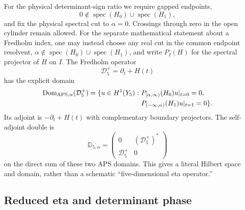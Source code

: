 \documentclass[11pt]{article}
\theoremstyle{definition}
\theoremstyle{remark}
\newcommand{\cD}{\mathcal D}
\begin{document}
For the physical determinant-sign ratio we require gapped endpoints,
\begin{equation}
 0\notin\operatorname{spec}(H_0)\cup\operatorname{spec}(H_1),
 \label{eq:zero-cut-gap}
\end{equation}
and fix the physical spectral cut to \(\alpha=0\).  Crossings through zero in
the open cylinder remain allowed.  For the separate mathematical statement
about a Fredholm index, one may instead choose any real cut in the common
endpoint resolvent,
\(\alpha\notin\operatorname{spec}(H_0)\cup\operatorname{spec}(H_1)\), and
write \(P_I(H)\) for the spectral projector of \(H\) on \(I\).  The Fredholm
operator
\begin{equation}
 \cD_5^+=\partial_t+H(t)
 \label{eq:five-d-operator}
\end{equation}
has the explicit domain
\begin{equation}
 \begin{split}
 \operatorname{Dom}_{\rm APS,\alpha}(\cD_5^+)
 =\{u\in H^1(Y_5):\ &P_{[\alpha,\infty)}(H_0)u|_{t=0}=0,\\
 &P_{(-\infty,\alpha)}(H_1)u|_{t=1}=0\}.
 \end{split}
 \label{eq:aps-domain}
\end{equation}
Its adjoint is \(-\partial_t+H(t)\) with complementary boundary projectors.
The self-adjoint double is
\begin{equation}
 \mathbb D_{5,\alpha}=
 \begin{pmatrix}0&(\cD_5^+)^*\\ \cD_5^+&0\end{pmatrix}
 \label{eq:selfadjoint-double}
\end{equation}
on the direct sum of these two APS domains.  This gives a literal Hilbert
space and domain, rather than a schematic ``five-dimensional eta
operator.''

\subsection{Reduced eta and determinant phase}
\end{document}
